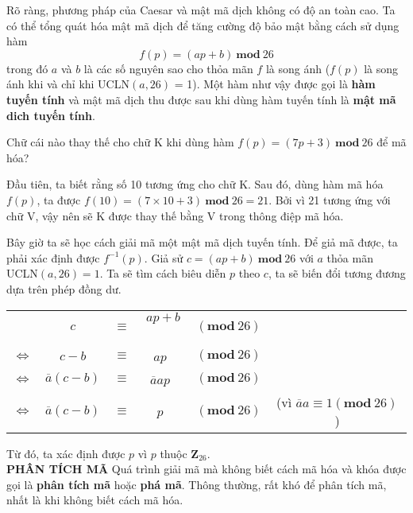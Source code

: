 Rõ ràng, phương pháp của Caesar và mật mã dịch không có độ an toàn cao.
Ta có thể tổng quát hóa mật mã dịch để tăng cường độ bảo mật
bằng cách sử dụng hàm
$$f(p) = (ap+b)\ \mathbf{mod}\ 26$$
trong đó $a$ và $b$ là các số nguyên sao cho thỏa mãn $f$ là song ánh ($f(p)$ là song ánh khi và chỉ khi
UCLN$(a,26)$ = 1). Một hàm như vậy được gọi là \textbf{hàm tuyến tính} và mật mã dịch thu được sau khi dùng hàm tuyến tính là \textbf{mật mã dich tuyến tính}.
\begin{example}
    Chữ cái nào thay thế cho chữ K khi dùng hàm $f(p) = (7p + 3)\ \textbf{mod}\ 26$ để mã hóa?
\end{example}
\begin{solution}
    Đầu tiên, ta biết rằng số 10 tương ứng cho chữ K. Sau đó, dùng hàm mã hóa
    $f(p)$, ta được $f (10) = (7 \times 10 + 3)\ \textbf{mod}\ 26 = 21$. Bởi vì 21 tương ứng
    với chữ V, vậy nên sẽ K được thay thế bằng V trong thông điệp mã hóa.
\end{solution}

Bây giờ ta sẽ học cách giải mã một mật mã dịch tuyến tính. Để giả mã được, ta phải xác định được $f^{-1}(p)$.
Giả sử $c= (ap+b)\ \mathbf{mod}\ 26$
với $a$ thỏa mãn UCLN$(a,26)=1$. Ta sẽ tìm cách biêu diễn $p$ theo $c$, ta sẽ biến đổi tương đương dựa trên phép đồng dư.

\begin{center}
    \begin{tabular}{ c c c c c c }
                           & $c$                    & $\equiv$ & $ap+b$\            & $(\textbf{mod}\ 26)$ &                                                  \\
        $\Leftrightarrow $ & $c - b$                & $\equiv$ & $ap$\              & $(\textbf{mod}\ 26)$ &                                                  \\
        $\Leftrightarrow $ & $\overline{a} (c - b)$ & $\equiv$ & $\overline{a}ap$\  & $(\textbf{mod}\ 26)$ &                                                  \\
        $\Leftrightarrow $ & $\overline{a} (c - b)$ & $\equiv$ & $p$\               & $(\textbf{mod}\ 26)$ & (vì $\overline{a}a \equiv 1 (\textbf{mod}\ 26)$) \\
    \end{tabular}
\end{center}
Từ đó, ta xác định được $p$ vì $p$ thuộc $\mathbf{Z}_{26}$. \\

\noindent \textcolor{Mycolor}{\textbf{PHÂN TÍCH MÃ}} Quá trình giải mã mà không biết cách mã hóa và khóa được gọi là \textbf{phân tích mã} hoặc \textbf{phá mã}.
Thông thường, rất khó để phân tích mã, nhất là khi không biết cách mã hóa.

